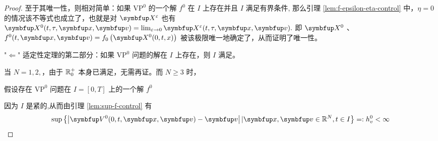 \begin{proof}
至于其唯一性，则相对简单：如果 $\text{VP}^{0}$ 的一个解 $f^{0}$ 在 $I$ 上存在并且 $I$ 满足有界条件, 那么引理 \ref{lem:f-epsilon-eta-control} 中，$\eta=0$ 的情况该不等式也成立了，也就是对 $\vect{X}^\varepsilon$ 也有 $\vect{X}^{0}(t, \tau, \vx, \vv)=\lim _{\varepsilon \rightarrow 0} \vect{X}^{\varepsilon}(t, \tau, \vx, \vv) .$ 即 $\vect{X}^{0}$ 、$f^{0}(t, \vx, \vv)=f_{0}\left(\vect{X}^{0}(0, t, x)\right)$ 被该极限唯一地确定了，从而证明了唯一性。

"$\Leftarrow$" 适定性定理的第二部分：如果 $\text{VP}^{0}$ 问题的解在 $I$ 上存在，则 $I$ 满足\boundcondition。 

当 $N=1,2,$，由于 ${\mathbb{R}}_0^{+}$ 本身已满足\boundcondition，无需再证。而 $N \geqslant 3$ 时，


假设存在 $\text{VP}^{0}$ 问题在 $I=[0, T]$ 上的一个解 $f^{0}$ 

因为 $I$ 是紧的,从而由引理 \ref{lem:sup-f-control} 有
\[
\sup \left\{\left|\vect{V}^{0}(0, t, \vx, \vv)-\vv\right| |\vx, \vv\in \bbR^{N}, t \in I\right\}=: h_{v}^{0}<\infty
\]


\end{proof}
